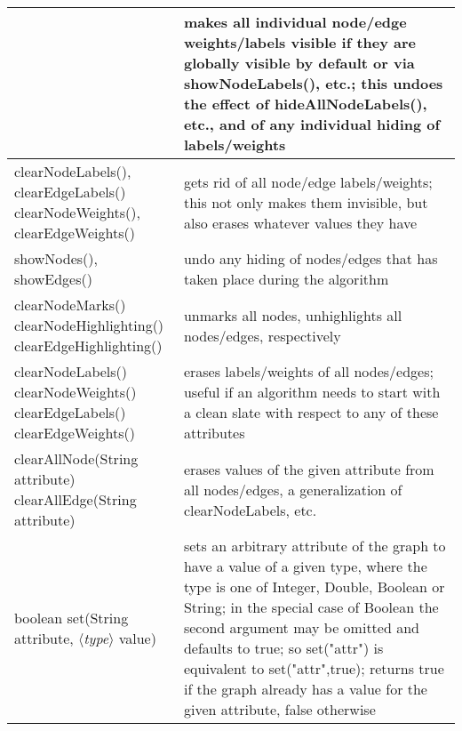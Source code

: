 \begin{table}
\begin{tabular}{| m{} | m{} |}
{    }
    &
    makes all individual
    node/edge weights/labels visible if they are globally visible by default
    or via \textsf{showNodeLabels()}, etc.;
    this undoes the effect of \textsf{hideAllNodeLabels()}, etc., and of
    any individual hiding of labels/weights
    \\ \hline
    \shortstack[l]{
      \textsf{clearNodeLabels(), clearEdgeLabels()}\\
      \textsf{clearNodeWeights(), clearEdgeWeights()}
    }
    &
    gets rid of all node/edge labels/weights; this not only makes them invisible,
    but also erases whatever values they have
    \\ \hline
    \textsf{showNodes(), showEdges()}
    &
    undo any hiding of nodes/edges that has taken place during the algorithm
    \\ \hline
    \shortstack[l]{
      \textsf{clearNodeMarks()}\\
      \textsf{clearNodeHighlighting()}\\
      \textsf{clearEdgeHighlighting()}
    }
    &
    unmarks all nodes, unhighlights all nodes/edges, respectively
    \\ \hline
    \shortstack[l]{
      \textsf{clearNodeLabels()}\\
      \textsf{clearNodeWeights()}\\
      \textsf{clearEdgeLabels()}\\
      \textsf{clearEdgeWeights()}
    }
    &
    erases labels/weights of all nodes/edges; useful if an algorithm needs to
    start with a clean slate with respect to any of these attributes
    \\ \hline
    \shortstack[l]{
      \textsf{clearAllNode(String attribute)}\\
      \textsf{clearAllEdge(String attribute)}
    }
    &
    erases values of the given attribute from all nodes/edges, a generalization of
    \textsf{clearNodeLabels}, etc.
    \\ \hline
    \textsf{boolean set(String attribute, $\langle$\emph{type}$\rangle$ value)}
    &
    sets an arbitrary attribute of the graph to have a value of a given type, where
    the type is one of \textsf{Integer}, \textsf{Double}, \textsf{Boolean}
    or \textsf{String};
    in the special case of \textsf{Boolean} the second argument may be omitted
    and defaults to \textsf{true};
    so \textsf{set("attr")} is equivalent to \textsf{set("attr",true)};
    returns \textsf{true} if the graph already has a value for the given attribute,
    \textsf{false} otherwise

\end{tabular}
\end{table}
